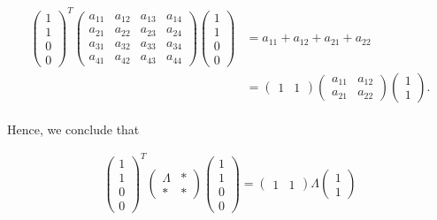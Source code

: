 \begin{align}
\begin{split}
\begin{pmatrix}1 \\ 1 \\ 0 \\ 0 \end{pmatrix}^T \begin{pmatrix}a_{11} & a_{12} & a_{13} & a_{14}\\ 
a_{21} & a_{22} & a_{23} & a_{24} \\ 
a_{31} & a_{32} & a_{33} & a_{34} \\
a_{41} & a_{42} & a_{43} & a_{44} \end{pmatrix} \begin{pmatrix}1 \\ 1 \\ 0 \\ 0 \end{pmatrix} &= a_{11} + a_{12} + a_{21} + a_{22}\\ &= \begin{pmatrix} 1 & 1 \end{pmatrix}\begin{pmatrix} a_{11} & a_{12} \\ a_{21} & a_{22} \end{pmatrix}\begin{pmatrix} 1 \\ 1 \end{pmatrix}.
\end{split}
\end{align}

Hence, we conclude that 

\begin{align}
\begin{pmatrix}1 \\ 1 \\ 0 \\ 0 \end{pmatrix}^T \begin{pmatrix}\Lambda & \ast \\
\ast & \ast \end{pmatrix}\begin{pmatrix}1 \\ 1 \\ 0 \\ 0 \end{pmatrix} = \begin{pmatrix} 1 & 1 \end{pmatrix}\Lambda\begin{pmatrix} 1 \\ 1 \end{pmatrix}
\end{align}

